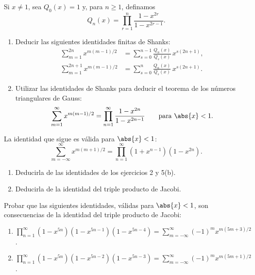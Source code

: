     \begin{ejercicio}
        Si $x\neq1$, sea $Q_0(x)=1$ y, para $n\geq1$, definamos
        \begin{equation*}
            Q_n(x)=\prod_{r=1}^{n}\frac{1-x^{2r}}{1-x^{2r-1}}.
        \end{equation*}
        \begin{enumerate}
            \item[(a)] Deducir las siguientes identidades finitas de Shanks:
            \begin{align*}
                \sum_{m=1}^{2n}x^{m(m-1)/2}&=\sum_{s=0}^{n-1}\frac{Q_n(x)}{Q_s(x)}\,x^{s(2n+1)},\\
                \sum_{m=1}^{2n+1}x^{m(m-1)/2}&=\sum_{s=0}^{n}\frac{Q_n(x)}{Q_s(x)}\,x^{s(2n+1)}.
            \end{align*}
            \item[(b)] Utilizar las identidades de Shanks para deducir el teorema de los
            números triangulares de Gauss:
            \begin{equation*}
                \sum_{m=1}^{\infty}x^{m(m-1)/2}=\prod_{n=1}^{\infty}\frac{1-x^{2n}}{1-x^{2n-1}}\qquad\text{para }\abs{x}<1.
            \end{equation*}
        \end{enumerate}
    \end{ejercicio}

    \begin{ejercicio}
        La identidad que sigue es válida para $\abs{x}<1$:
        \begin{equation*}
            \sum_{m=-\infty}^{\infty}x^{m(m+1)/2}=\prod_{n=1}^{\infty}(1+x^{n-1})(1-x^{2n}).
        \end{equation*}
        \begin{enumerate}
            \item[(a)] Deducirla de las identidades de los ejercicios 2 y 5(b).
            \item[(b)] Deducirla de la identidad del triple producto de Jacobi.
        \end{enumerate}
    \end{ejercicio}

    \begin{ejercicio}
        Probar que las siguientes identidades, válidas para $\abs{x}<1$, son consecuencias de la
        identidad del triple producto de Jacobi:
        \begin{enumerate}
            \item[(a)] $\displaystyle\prod_{n=1}^{\infty}(1-x^{5n})(1-x^{5n-1})(1-x^{5n-4})=\sum_{m=-\infty}^{\infty}(-1)^mx^{m(5m+3)/2}$.
            \item[(b)] $\displaystyle\prod_{n=1}^{\infty}(1-x^{5n})(1-x^{5n-2})(1-x^{5n-3})=\sum_{m=-\infty}^{\infty}(-1)^mx^{m(5m+1)/2}$.
        \end{enumerate}
    \end{ejercicio}

